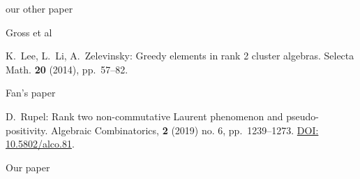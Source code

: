 \documentclass{amsart}
\numberwithin{theorem}{section}
\begin{document}
  \begin{thebibliography}{XXX}
      our other paper

      Gross et al

      K.~Lee, L.~Li, A.~Zelevinsky: Greedy elements in rank 2 cluster algebras. Selecta Math. \textbf{20} (2014), pp.~57--82.

      Fan's paper

      D.~Rupel: Rank two non-commutative Laurent phenomenon and pseudo-positivity.  Algebraic Combinatorics, \textbf{2} (2019) no. 6, pp.~1239--1273. \href{https://doi.org/10.5802/alco.81}{DOI: 10.5802/alco.81}.

      Our paper
  \end{thebibliography}


  
\end{document}
